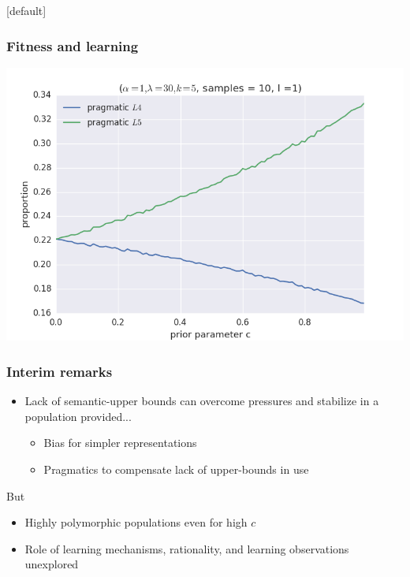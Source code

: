 \documentclass{beamer} %
\makeatletter
\newenvironment{withoutheadline}{
        \setbeamertemplate{headline}[default]
        \def\beamer@entrycode{\vspace*{-\headheight}}
    }{}
\makeatother
\begin{document}
\begin{withoutheadline}
\begin{frame}
\end{frame}

\begin{frame}
	\frametitle{Fitness and learning}

\includegraphics[width=\linewidth,height=\textheight,keepaspectratio]{03cost-with-l1}

\end{frame}

\begin{frame}
  \frametitle{Interim remarks}
  \begin{itemize}
	\item Lack of semantic-upper bounds can overcome pressures and stabilize in a population provided...
	  \begin{itemize}
		\item Bias for simpler representations
		\item Pragmatics to compensate lack of upper-bounds in use
	  \end{itemize}
  \end{itemize}
\pause
  But

  \begin{itemize}
    \item Highly polymorphic populations even for high $c$
    \item Role of learning mechanisms, rationality, and learning observations unexplored
  \end{itemize}

\end{frame}


\end{withoutheadline}
\end{document}
